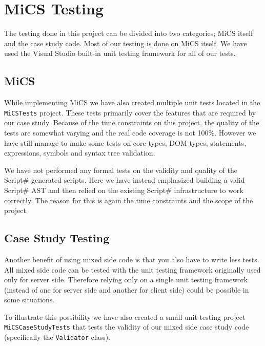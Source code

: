 \chapter{MiCS Testing}
	The testing done in this project can be divided into two categories; MiCS itself and the case study code. Most of our testing is done on MiCS itself. We have used the Visual Studio built-in unit testing framework for all of our tests.
\section{MiCS} %
\label{sec:mics}
	While implementing MiCS we have also created multiple unit tests located in the \texttt{MiCSTests} project. These tests primarily cover the features that are required by our case study. Because of the time constraints on this project, the quality of the tests are somewhat varying and the real code coverage is not 100\%. However we have still manage to make some tests on core types, DOM types, statements, expressions, symbols and syntax tree validation.

	We have not performed any formal tests on the validity and quality of the Script\# generated scripts. Here we have instead emphasized building a valid Script\# AST and then relied on the existing Script\# infrastructure to work correctly. The reason for this is again the time constraints and the scope of the project.
\section{Case Study Testing} %
\label{sec:user_code_testing}
	Another benefit of using mixed side code is that you also have to write less tests. All mixed side code can be tested with the unit testing framework originally used only for server side. Therefore relying only on a single unit testing framework (instead of one for server side and another for client side) could be possible in some situations.

	To illustrate this possibility we have also created a small unit testing project \texttt{MiCSCaseStudyTests} that tests the validity of our mixed side case study code (specifically the \texttt{Validator} class).

